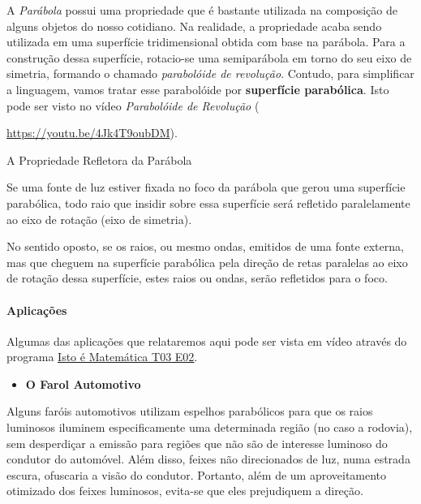 \label{\detokenize{AF209-11:sub-funcao-quadratica-prop-refletora}}\label{\detokenize{AF209-11:a-propriedade-refletora-da-parabola}}
A \textit{Parábola} possui uma propriedade que é bastante utilizada na composição de alguns objetos do nosso cotidiano. Na realidade, a propriedade acaba sendo utilizada em uma superfície tridimensional obtida com base na parábola. Para a construção dessa superfície, rotacio-se uma semiparábola em torno do seu eixo de simetria, formando o chamado \textit{parabolóide de revolução}. Contudo, para simplificar a linguagem, vamos tratar esse parabolóide por \textbf{superfície parabólica}. Isto pode ser visto no vídeo \textit{Parabolóide de Revolução} ({\url{https://youtu.be/4Jk4T9oubDM}).

\begin{observationtitle}{A Propriedade Refletora da Parábola}

Se uma fonte de luz estiver fixada no foco da parábola que gerou uma superfície parabólica, todo raio que insidir sobre essa superfície será refletido  paralelamente ao eixo de rotação (eixo de simetria).

No sentido oposto, se os raios, ou mesmo ondas, emitidos de uma fonte externa, mas que cheguem na superfície parabólica pela direção de retas paralelas ao eixo de rotação dessa superfície, estes raios ou ondas, serão refletidos para o foco.
\end{observationtitle}

\paragraph{Aplicações}

Algumas das aplicações que relataremos aqui pode ser vista em vídeo através do programa \href{https://youtu.be/X59mM76CL\_g}{Isto é Matemática T03 E02}.
\begin{itemize}
\item {} 
\textbf{O Farol Automotivo}

\end{itemize}

Alguns faróis automotivos utilizam espelhos parabólicos para que os raios luminosos iluminem especificamente uma determinada região (no caso a rodovia), sem desperdiçar a emissão para regiões que não são de interesse luminoso do condutor do automóvel. Além disso, feixes não direcionados de luz, numa estrada escura, ofuscaria a visão do condutor. Portanto, além de um aproveitamento otimizado dos feixes luminosos, evita-se que eles prejudiquem a direção.

}
